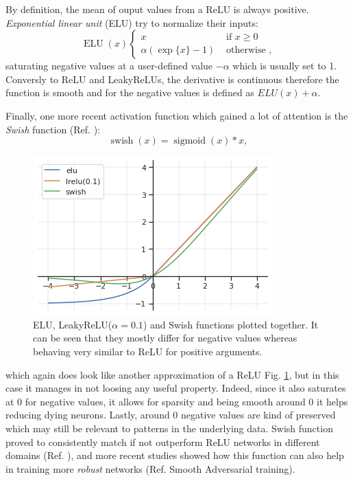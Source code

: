 \documentclass[LaM,binding=0.6cm]{./packages/sapthesis/sapthesis}
\begin{document}
            By definition, the mean of ouput values from a ReLU is always positive. \textit{Exponential linear unit} (ELU) try to normalize their inputs:
            \begin{equation}
                \label{elu}
                \operatorname{ELU}(x)\left\{\begin{array}{ll}
                    x & \text { if } x \geq 0 \\
                    \alpha(\exp \{x\}-1) & \text { otherwise },
                    \end{array}\right.
            \end{equation}
            saturating negative values at a user-defined value $- \alpha$ which is usually set to 1. Conversly to ReLU and LeakyReLUs, the derivative is continuous
            therefore the function is smooth and for the negative values is defined as $ELU(x) + \alpha$.

            Finally, one more recent activation function which gained a lot of attention is the \textit{Swish} function (Ref. ):
            \begin{equation}
                \operatorname{swish}(x)= \operatorname{sigmoid}(x) * x,
            \end{equation}
            
            \begin{figure}[hb!]
                \centering
                \includegraphics[scale=0.50]{afunctions}
                \caption{ELU, LeakyReLU($\alpha=0.1$) and Swish functions plotted together. It can be seen that they mostly differ for negative values whereas behaving very similar to ReLU for positive arguments.}
                \label{fig:afuncs}
            \end{figure}
            which again does look like another approximation of a ReLU Fig. \ref{fig:afuncs}, but in this case it manages in not loosing any useful property. Indeed, since
            it also saturates at 0 for negative values, it allows for sparsity and being smooth around 0 it helps reducing dying neurons. Lastly, around 0 negative 
            values are kind of preserved which may still be relevant to patterns in the underlying data.
            Swish function proved to consistently match if not outperform ReLU networks in different domains (Ref. ), and more recent studies showed how this function
            can also help in training more \textit{robust} networks (Ref. Smooth Adversarial training).
\end{document}

